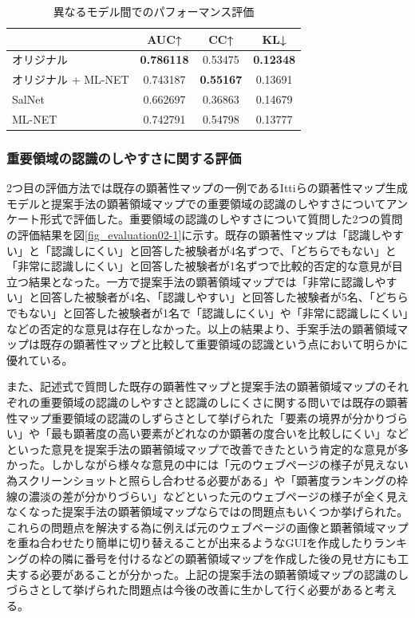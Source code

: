 \begin{table}[h]
  \caption{異なるモデル間でのパフォーマンス評価}
  \label{table:webpage-list2}
  \centering
  \begingroup
  \renewcommand{\arraystretch}{1.2} %
  \small
   \begin{tabular}{lccc}
    \hline
    & AUC↑ & CC↑ & KL↓ \\
    \hline \hline
    オリジナル & {\bf 0.786118} & 0.53475 & {\bf 0.12348} \\
    オリジナル + ML-NET & 0.743187 & {\bf 0.55167} & 0.13691 \\
    SalNet & 0.662697 & 0.36863 & 0.14679 \\
    ML-NET & 0.742791 & 0.54798 & 0.13777 \\
    \hline
  \end{tabular}
  \endgroup
\end{table}


\subsubsection{重要領域の認識のしやすさに関する評価}
\par 2つ目の評価方法では既存の顕著性マップの一例であるIttiらの顕著性マップ生成モデルと提案手法の顕著領域マップでの重要領域の認識のしやすさについてアンケート形式で評価した。重要領域の認識のしやすさについて質問した2つの質問の評価結果を図\ref{fig_evaluation02-1}に示す。既存の顕著性マップは「認識しやすい」と「認識しにくい」と回答した被験者が4名ずつで、「どちらでもない」と「非常に認識しにくい」と回答した被験者が1名ずつで比較的否定的な意見が目立つ結果となった。一方で提案手法の顕著領域マップでは「非常に認識しやすい」と回答した被験者が4名、「認識しやすい」と回答した被験者が5名、「どちらでもない」と回答した被験者が1名で「認識しにくい」や「非常に認識しにくい」などの否定的な意見は存在しなかった。以上の結果より、手案手法の顕著領域マップは既存の顕著性マップと比較して重要領域の認識という点において明らかに優れている。

\par また、記述式で質問した既存の顕著性マップと提案手法の顕著領域マップのそれぞれの重要領域の認識のしやすさと認識のしにくさに関する問いでは既存の顕著性マップ重要領域の認識のしずらさとして挙げられた「要素の境界が分かりづらい」や「最も顕著度の高い要素がどれなのか顕著の度合いを比較しにくい」などといった意見を提案手法の顕著領域マップで改善できたという肯定的な意見が多かった。しかしながら様々な意見の中には「元のウェブページの様子が見えない為スクリーンショットと照らし合わせる必要がある」や「顕著度ランキングの枠線の濃淡の差が分かりづらい」などといった元のウェブページの様子が全く見えなくなった提案手法の顕著領域マップならではの問題点もいくつか挙げられた。これらの問題点を解決する為に例えば元のウェブページの画像と顕著領域マップを重ね合わせたり簡単に切り替えることが出来るようなGUIを作成したりランキングの枠の隣に番号を付けるなどの顕著領域マップを作成した後の見せ方にも工夫する必要があることが分かった。上記の提案手法の顕著領域マップの認識のしづらさとして挙げられた問題点は今後の改善に生かして行く必要があると考える。

